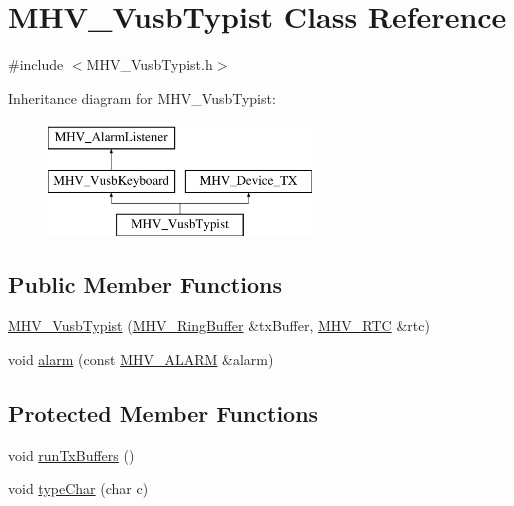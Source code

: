 \hypertarget{class_m_h_v___vusb_typist}{
\section{\-M\-H\-V\-\_\-\-Vusb\-Typist \-Class \-Reference}
\label{class_m_h_v___vusb_typist}
}


{\ttfamily \#include $<$\-M\-H\-V\-\_\-\-Vusb\-Typist.\-h$>$}

\-Inheritance diagram for \-M\-H\-V\-\_\-\-Vusb\-Typist\-:\begin{figure}[H]
\begin{center}
\leavevmode
\includegraphics[height=3.000000cm]{class_m_h_v___vusb_typist}
\end{center}
\end{figure}
\subsection*{\-Public \-Member \-Functions}
\begin{DoxyCompactItemize}
\item 
\hyperlink{class_m_h_v___vusb_typist_abec936c0ca44586fec7bd76430feac71}{\-M\-H\-V\-\_\-\-Vusb\-Typist} (\hyperlink{class_m_h_v___ring_buffer}{\-M\-H\-V\-\_\-\-Ring\-Buffer} \&tx\-Buffer, \hyperlink{class_m_h_v___r_t_c}{\-M\-H\-V\-\_\-\-R\-T\-C} \&rtc)
\item 
void \hyperlink{class_m_h_v___vusb_typist_a03207239279498b3bd39de8760d4ba09}{alarm} (const \hyperlink{_m_h_v___r_t_c_8h_af13307658f41fba330ffae04dd5cbce6}{\-M\-H\-V\-\_\-\-A\-L\-A\-R\-M} \&alarm)
\end{DoxyCompactItemize}
\subsection*{\-Protected \-Member \-Functions}
\begin{DoxyCompactItemize}
\item 
void \hyperlink{class_m_h_v___vusb_typist_a171cec2829ab07c838ffda3e7c3b9871}{run\-Tx\-Buffers} ()
\item 
void \hyperlink{class_m_h_v___vusb_typist_a20f527471b7f3a907d3969eaf4a04689}{type\-Char} (char c)
\end{DoxyCompactItemize}
